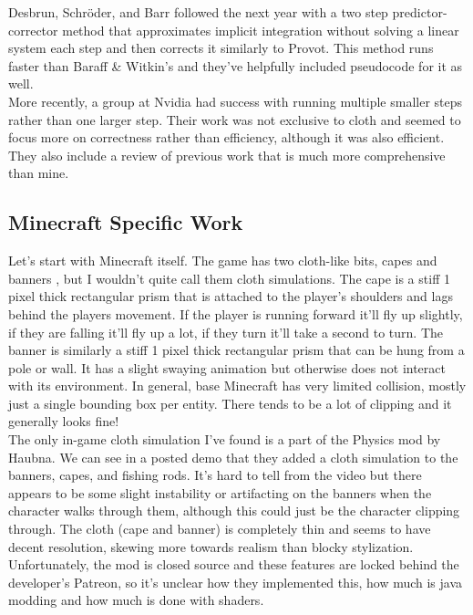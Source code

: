 \documentclass[12pt, twocolumn]{article}
\begin{document}
Desbrun, Schröder, and Barr followed the next year \cite{interanim} with a two step predictor-corrector method that approximates implicit integration without solving a linear system each step and then corrects it similarly to Provot. This method runs faster than Baraff \& Witkin's and they've helpfully included pseudocode for it as well.\\

More recently, a group at Nvidia \cite{smallsteps} had success with running multiple smaller steps rather than one larger step. Their work was not exclusive to cloth and seemed to focus more on correctness rather than efficiency, although it was also efficient. They also include a review of previous work that is much more comprehensive than mine.

\subsection{Minecraft Specific Work}

Let's start with Minecraft itself. The game has two cloth-like bits, capes \cite{mccape} and banners \cite{mcbanner}, but I wouldn't quite call them cloth simulations. The cape is a stiff 1 pixel thick rectangular prism that is attached to the player's shoulders and lags behind the players movement. If the player is running forward it'll fly up slightly, if they are falling it'll fly up a lot, if they turn it'll take a second to turn. The banner is similarly a stiff 1 pixel thick rectangular prism that can be hung from a pole or wall. It has a slight swaying animation but otherwise does not interact with its environment. In general, base Minecraft has very limited collision, mostly just a single bounding box per entity. There tends to be a lot of clipping and it generally looks fine!\\

The only in-game cloth simulation I've found is a part of the Physics mod \cite{physicsmod} by Haubna. We can see in a posted demo \cite{physicsmodcloth} that they added a cloth simulation to the banners, capes, and fishing rods. It's hard to tell from the video but there appears to be some slight instability or artifacting on the banners when the character walks through them, although this could just be the character clipping through. The cloth (cape and banner) is completely thin and seems to have decent resolution, skewing more towards realism than blocky stylization. Unfortunately, the mod is closed source and these features are locked behind the developer's Patreon, so it's unclear how they implemented this, how much is java modding and how much is done with shaders.\\
\end{document}

